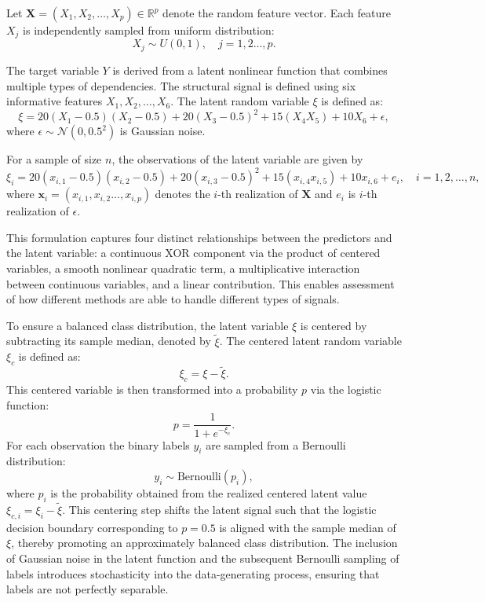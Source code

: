 Let $\mathbf{X} = (X_1,X_2, \dots, X_p) \in \mathbb{R}^p$ denote the random feature vector. Each feature $X_j$ is independently sampled from uniform distribution:
\begin{equation*}
X_j \sim U(0, 1), \quad j = 1,2 \dots, p.
\end{equation*}

The target variable $Y$ is derived from a latent nonlinear function that combines multiple types of dependencies. The structural signal is defined using six informative features $X_1,X_2, \dots, X_6$. The latent random variable $\xi$ is defined as:
\begin{equation*}
\xi = 20(X_1 - 0.5)(X_2 - 0.5) + 20(X_3 - 0.5)^2 + 15(X_4 X_5) + 10X_6 + \epsilon,
\end{equation*}
where $\epsilon \sim \mathcal{N}(0, 0.5^2)$ is Gaussian noise.

For a sample of size $n$, the observations of the latent variable are given by
\begin{equation*}
\xi_i = 20(x_{i,1} - 0.5)(x_{i,2} - 0.5) + 20(x_{i,3} - 0.5)^2 + 15(x_{i,4} x_{i,5}) + 10x_{i,6} + e_i, \quad i = 1,2, \dots, n,
\end{equation*}
where $\mathbf{x}_i = (x_{i,1},x_{i,2}\dots, x_{i,p})$ denotes the $i$-th realization of $\mathbf{X}$ and $e_i$ is $i$-th realization of $\epsilon$.

This formulation captures four distinct relationships between the predictors and the latent variable: a continuous XOR component via the product of centered variables, a smooth nonlinear quadratic term, a multiplicative interaction between continuous variables, and a linear contribution. This enables assessment of how different methods are able to handle different types of signals.

To ensure a balanced class distribution, the latent variable $\xi$ is centered by subtracting its sample median, denoted by $\tilde{\xi}$. The centered latent random variable $\xi_c$ is defined as:
\begin{equation*}
    \xi_c = \xi - \tilde{\xi}.
\end{equation*}
This centered variable is then transformed into a probability $p$ via the logistic function:
\begin{equation*}
    p = \frac{1}{1 + e^{-\xi_c}}.
\end{equation*}
For each observation the binary labels $y_i$ are sampled from a Bernoulli distribution:
\begin{equation*}
    y_i \sim \text{Bernoulli}(p_i),
\end{equation*}
where $p_i$ is the probability obtained from the realized centered latent value $\xi_{c,i} = \xi_i - \tilde{\xi}$. This centering step shifts the latent signal such that the logistic decision boundary corresponding to $p = 0.5$ is aligned with the sample median of $\xi$, thereby promoting an approximately balanced class distribution. The inclusion of Gaussian noise in the latent function and the subsequent Bernoulli sampling of labels introduces stochasticity into the data-generating process, ensuring that labels are not perfectly separable.


